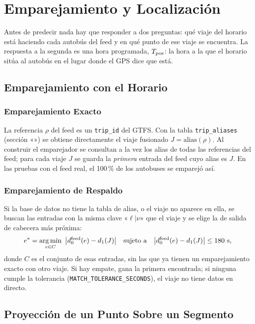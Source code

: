 \chapter{Emparejamiento y Localización}
\label{cap:localizacion}

Antes de predecir nada hay que responder a dos preguntas: qué viaje del horario está haciendo cada autobús del feed y
en qué punto de ese viaje se encuentra. La respuesta a la segunda es una hora programada, $T_{\mathrm{pos}}$: la hora a la que el
horario sitúa al autobús en el lugar donde el GPS dice que está.

\section{Emparejamiento con el Horario}
\label{sec:emparejamiento}

\subsection{Emparejamiento Exacto} La referencia $\rho$ del feed es un \texttt{trip\_id} del GTFS. Con la tabla
\texttt{trip\_aliases} (sección «») se obtiene directamente el viaje fusionado $J=\mathrm{alias}(\rho)$.
Al construir el emparejador se consultan a la vez los alias de todas las referencias del feed; para cada viaje $J$ se
guarda la \emph{primera} entrada del feed cuyo alias es $J$. En las pruebas con el feed real, el 100\,\% de los
autobuses se emparejó así.

\subsection{Emparejamiento de Respaldo} Si la base de datos no tiene la tabla de alias, o el viaje no aparece en ella,
se buscan las entradas con la misma clave «$\ell|\nu$» que el viaje y se elige la de salida de cabecera más próxima:
\begin{equation}
e^\ast=\argmin_{e\in C}\ \big|d_0^{\mathrm{feed}}(e)-d_1(J)\big|
\quad\text{sujeto a}\quad \big|d_0^{\mathrm{feed}}(e)-d_1(J)\big|\le 180\ \mathrm{s},
\end{equation}
donde $C$ es el conjunto de esas entradas, sin las que ya tienen un emparejamiento exacto con otro viaje. Si hay
empate, gana la primera encontrada; si ninguna cumple la tolerancia (\texttt{MATCH\_TOLERANCE\_SECONDS}), el viaje no tiene datos en directo.

\section{Proyección de un Punto Sobre un Segmento}
\label{sec:proyeccion}

